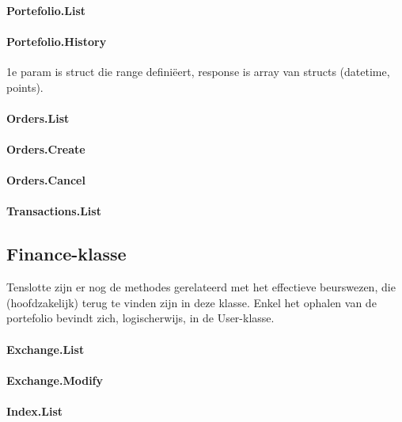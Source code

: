 \paragraph{Portefolio.List}

\paragraph{Portefolio.History}

1e param is struct die range definiëert, response is array van structs (datetime, points).

\paragraph{Orders.List}

\paragraph{Orders.Create}

\paragraph{Orders.Cancel}

\paragraph{Transactions.List}


\subsection{Finance-klasse}

Tenslotte zijn er nog de methodes gerelateerd met het effectieve beurswezen, die (hoofdzakelijk) terug te vinden zijn in deze klasse. Enkel het ophalen van de portefolio bevindt zich, logischerwijs, in de User-klasse.

\paragraph{Exchange.List}

\paragraph{Exchange.Modify}

\paragraph{Index.List}

